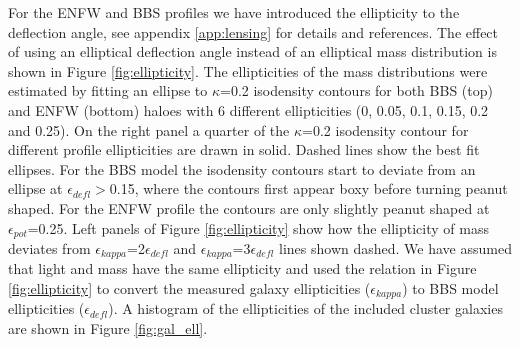 \documentclass[useAMS,usenatbib]{mn2e}
\begin{document}
For the ENFW and BBS profiles we have introduced the ellipticity to
the deflection angle, see appendix \ref{app:lensing} for details and
references. The effect of using an elliptical deflection angle instead
of an elliptical mass distribution is shown in Figure
\ref{fig:ellipticity}. The ellipticities of the mass distributions
were estimated by fitting an ellipse to $\kappa$=0.2 isodensity
contours for both BBS (top) and ENFW (bottom) haloes with 6 different
ellipticities (0, 0.05, 0.1, 0.15, 0.2 and 0.25). On the right panel a
quarter of the $\kappa$=0.2 isodensity contour for different profile
ellipticities are drawn in solid. Dashed lines show the best fit
ellipses. For the BBS model the isodensity contours start to deviate
from an ellipse at $\epsilon_{defl}>$0.15, where the contours first
appear boxy before turning peanut shaped. For the ENFW profile the
contours are only slightly peanut shaped at
$\epsilon_{pot}$=0.25. Left panels of Figure \ref{fig:ellipticity}
show how the ellipticity of mass deviates from
$\epsilon_{kappa}$=2$\epsilon_{defl}$ and
$\epsilon_{kappa}$=3$\epsilon_{defl}$ lines shown dashed. We have
assumed that light and mass have the same ellipticity and used the
relation in Figure \ref{fig:ellipticity} to convert the measured
galaxy ellipticities ($\epsilon_{kappa}$) to BBS model ellipticities
($\epsilon_{defl}$). A histogram of the ellipticities of the included
cluster galaxies are shown in Figure \ref{fig:gal_ell}.\\
\end{document}
